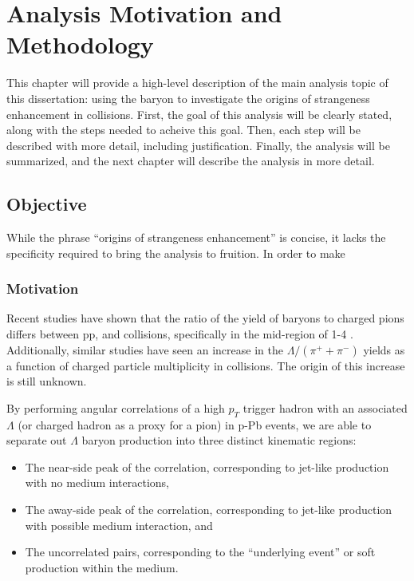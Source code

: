 \chapter{Analysis Motivation and Methodology}
\label{ch:analysis_mnm}

This chapter will provide a high-level description of the main analysis topic of this dissertation: using the \lmb baryon to investigate the origins of strangeness enhancement in \pPb collisions. First, the goal of this analysis will be clearly stated, along with the steps needed to acheive this goal. Then, each step will be described with more detail, including justification. Finally, the analysis will be summarized, and the next chapter will describe the analysis in more detail.

\section{Objective}
While the phrase ``origins of strangeness enhancement'' is concise, it lacks the specificity required to bring the analysis to fruition. In order to make 


\subsection{Motivation}
\label{motivation}
Recent studies have shown that the ratio of the yield of \lmb baryons to charged pions differs between pp, \pPb and \PbPb collisions, specifically in the mid-\pt region of 1-4 \GeVc.  Additionally, similar studies have seen an increase in the $\Lambda/(\pi^{+} + \pi^{-})$ yields as a function of charged particle multiplicity in \pPb collisions. The origin of this increase is still unknown.

By performing angular correlations of a high $p_T$ trigger hadron with an associated $\Lambda$ (or charged hadron as a proxy for a pion) in p-Pb events, we are able to separate out $\Lambda$ baryon production into three distinct kinematic regions:
\begin{itemize}
\item The near-side peak of the correlation, corresponding to jet-like production with no medium interactions,
\item The away-side peak of the correlation, corresponding to jet-like production with possible medium interaction, and
\item The uncorrelated pairs, corresponding to the ``underlying event'' or soft production within the medium.
\end{itemize}


